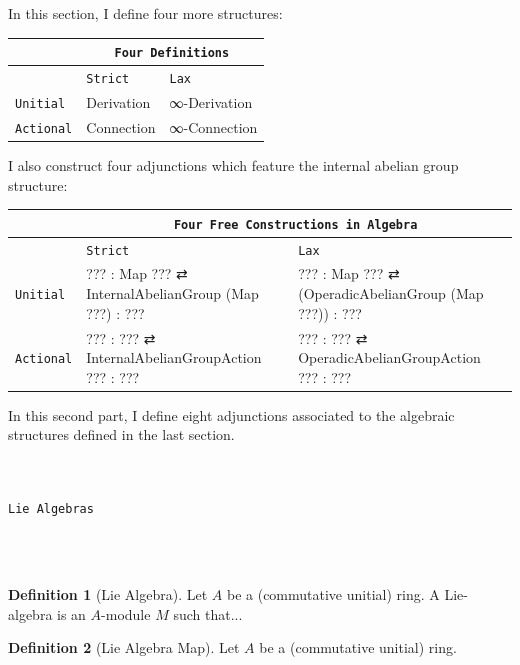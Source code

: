 \documentclass{book}
\theoremstyle{definition}
\newtheorem{definition}{Definition}
\renewcommand{\chapter}[1]{
\newpage
{
\Huge 
\begin{center}
\ \\
\ \\
\thispagestyle{empty}
\texttt{#1}
\end{center}}
\ \\
\ \\
}
\begin{document}
In this section, I define four more structures:

{
\footnotesize
\begin{center}
\begin{tabular}{||l || l || l ||} 
 \hline
 & \multicolumn{2}{||c||}{\texttt{Four Definitions}} \\
 \hline
 & \texttt{Strict} & \texttt{Lax} \\
 \hline
 \texttt{Unitial}  & Derivation & ∞-Derivation \\
 \hline
 \texttt{Actional} & Connection & ∞-Connection \\
 \hline
\end{tabular}
\end{center}
}

I also construct four adjunctions which feature the internal abelian group structure:

{
\footnotesize
\begin{center}
\begin{tabular}{||l || l || l ||} 
 \hline
 & \multicolumn{2}{||c||}{\texttt{Four Free Constructions in Algebra}} \\
 \hline
 \hline
  & \texttt{Strict} & \texttt{Lax}   \\
 \hline
 \texttt{Unitial}  & ??? : Map ??? ⇄ InternalAbelianGroup (Map ???) : ??? & ??? : Map ??? ⇄ (OperadicAbelianGroup (Map ???)) : ???  \\
 \hline
 \texttt{Actional} & ??? : ??? ⇄ InternalAbelianGroupAction ??? : ??? & ??? : ??? ⇄ OperadicAbelianGroupAction ??? : ??? \\
 \hline
\end{tabular}
\end{center}
}

In this second part, I define eight adjunctions associated to the algebraic structures defined in the last section.\\



\newpage
\chapter{Lie Algebras}

\begin{definition}[Lie Algebra] Let $A$ be a (commutative unitial) ring. A Lie-algebra is an $A$-module $M$ such that...
\end{definition}

\begin{definition}[Lie Algebra Map] Let $A$ be a (commutative unitial) ring.
\end{definition}
\end{document}
